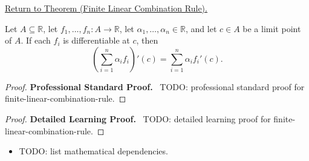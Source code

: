 \newpage
{}
\label{prf:finite-linear-combination-rule}

\begin{remark*}[Return]
\hyperref[thm:finite-linear-combination-rule]{Return to Theorem (Finite Linear Combination Rule).}
\end{remark*}

\begin{theorem*}
Let $A \subseteq \mathbb{R}$, let $f_1, \dots, f_n : A \to \mathbb{R}$, let $\alpha_1, \dots, \alpha_n \in \mathbb{R}$, and let $c \in A$ be a limit point of $A$. If each $f_i$ is differentiable at $c$, then
\[
\left(\sum_{i=1}^{n} \alpha_i f_i\right)'(c) = \sum_{i=1}^{n} \alpha_i f_i'(c).
\]
\end{theorem*}

\begin{proof}
\textbf{Professional Standard Proof.}~
TODO: professional standard proof for finite-linear-combination-rule.
\end{proof}

\begin{proof}
\textbf{Detailed Learning Proof.}~
TODO: detailed learning proof for finite-linear-combination-rule.
\end{proof}

\begin{remark*}
\end{remark*}

\begin{dependencies}
\begin{itemize}
  \item TODO: list mathematical dependencies.
\end{itemize}
\end{dependencies}

\clearpage
